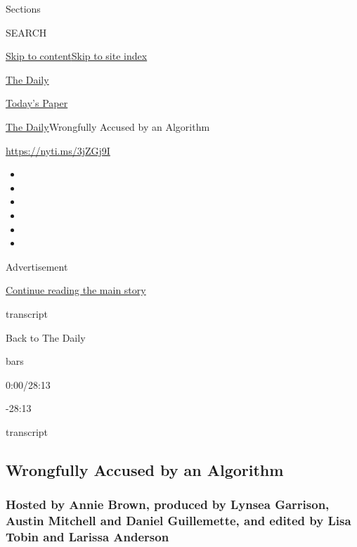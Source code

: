 Sections

SEARCH

\protect\hyperlink{site-content}{Skip to
content}\protect\hyperlink{site-index}{Skip to site index}

\href{https://www.nytimes3xbfgragh.onion/podcasts/the-daily}{The Daily}

\href{https://myaccount.nytimes3xbfgragh.onion/auth/login?response_type=cookie\&client_id=vi}{}

\href{https://www.nytimes3xbfgragh.onion/section/todayspaper}{Today's
Paper}

\href{/podcasts/the-daily}{The Daily}\textbar{}Wrongfully Accused by an
Algorithm

\url{https://nyti.ms/3jZGj9I}

\begin{itemize}
\item
\item
\item
\item
\item
\item
\end{itemize}

Advertisement

\protect\hyperlink{after-top}{Continue reading the main story}

transcript

Back to The Daily

bars

0:00/28:13

-28:13

transcript

\hypertarget{wrongfully-accused-by-an-algorithm}{%
\subsection{Wrongfully Accused by an
Algorithm}\label{wrongfully-accused-by-an-algorithm}}

\hypertarget{hosted-by-annie-brown-produced-by-lynsea-garrison-austin-mitchell-and-daniel-guillemette-and-edited-by-lisa-tobin-and-larissa-anderson}{%
\subsubsection{Hosted by Annie Brown, produced by Lynsea Garrison,
Austin Mitchell and Daniel Guillemette, and edited by Lisa Tobin and
Larissa
Anderson}\label{hosted-by-annie-brown-produced-by-lynsea-garrison-austin-mitchell-and-daniel-guillemette-and-edited-by-lisa-tobin-and-larissa-anderson}}

